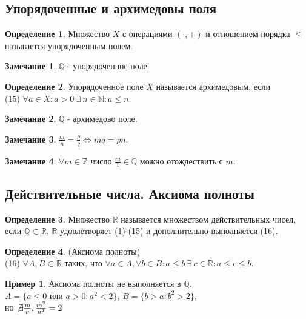 \documentclass[a4paper, 12pt]{article}
\newcommand{\Z}{\mathbb{Z}}
\newcommand{\N}{\mathbb{N}}
\newcommand{\R}{\mathbb{R}}
\newcommand{\Q}{\mathbb{Q}}
\theoremstyle{definition}
\newtheorem*{definition}{Определение}
\newtheorem*{comm}{Замечание}
\newtheorem*{example}{Пример}
\begin{document}
    \subsection{Упорядоченные и архимедовы поля}    
        \begin{definition}
            Множество $X$ с операциями $(\cdot, +)$ и отношением порядка $\leq$ называется упорядоченным полем.
        \end{definition}
        \begin{comm}
            $\Q$ - упорядоченное поле.
        \end{comm}  
        \begin{definition}
            Упорядоченное поле $X$ называется архимедовым, если\\
            (15) $\forall a\in X: a>0 \ \exists\ n\in \N: a\leq n$.
        \end{definition}
        \begin{comm}
            $\Q$ - архимедово поле.
        \end{comm} 
        \begin{comm}
            $\frac{m}{n}=\frac{p}{q} \Leftrightarrow mq=pn$.
        \end{comm}
        \begin{comm}
            $\forall m\in \Z$ число $\frac{m}{1}\in \Q$ можно отождествить с $m$.
        \end{comm}
    \subsection{Действительные числа. Аксиома полноты}
        \begin{definition}
            Множество $\R$ называется множеством действительных чисел, если $\Q \subset \R$, $\R$ удовлетворяет (1)-(15) и дополнительно выполняется (16).
        \end{definition}
        \begin{definition} (Аксиома полноты)\\
            (16) $\forall A,B\subset \R$ таких, что $\forall a\in A, \forall b\in B: a\leq b \ \exists \ c\in \R: a\leq c\leq b$.
        \end{definition}
        \begin{example}
        Аксиома полноты не выполняется в $\Q$.\\
        $A=\{a\leq 0$ или $a>0: a^2<2\}$, $B=\{b>a: b^2>2\}$,\\
        но $\not\exists \frac{m}{n}, \frac{m^2}{n^2}=2$
        \end{example}
\end{document}
